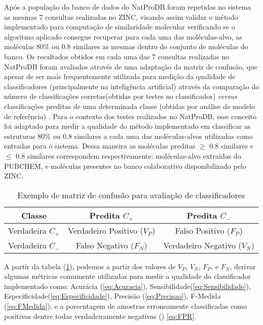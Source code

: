 Após a população do banco de dados do NatProDB foram repetidas no sistema as mesmas 7 consultas realizadas no ZINC, visando assim validar o método implementado para computação de similaridade molecular verificando se o algoritmo aplicado consegue recuperar para cada uma das moléculas-alvo, as moléculas 80\% ou 0.8 similares as mesmas dentro do conjunto de moléculas do banco. Os resultados obtidos em cada uma das 7 consultas realizadas no NatProDB foram avaliados através de uma adaptação da matriz de confusão, que apesar de ser mais frequentemente utilizada para medição da qualidade de classificadores (principalmente na inteligência artificial) através da comparação do número de classificações corretas(obtidas por testes no classificador) \textit{versus} classificações preditas de uma determinada classe (obtidas por análise de modelo de referência) \cite{davis2006relationship}. Para o contexto dos testes realizados no NatProDB, esse conceito foi adaptado para medir a qualidade do método implementado em classificar as estruturas 80\% ou 0.8 similares a cada uma das moléculas-alvos utilizadas como entradas para o sistema. Dessa maneira as moléculas preditas $\geq$ 0.8 similares e $\leq$ 0.8 similares correspondem respectivamente: moléculas-alvo extraídas do PUBCHEM, e moléculas presentes no banco colaborativo disponibilizado pelo ZINC.

\begin{table}[!htb]
	\centering
	\footnotesize
	\caption[Matriz de Confusão]{Exemplo de matriz de confusão para avaliação de classificadores}
	\label{tab:matrizconfusao}	
	\begin{tabular}{|c|c|c|}
		\hline \SPACE
		\textbf{Classe}&\textbf{Predita $C_+$} & \textbf{Predita $C_-$} \\ \hline \SPACE
	Verdadeira $C_+$  &	Verdadeiro Positivo ($V_P$) & Falso Positivo ($F_P$) \\ \hline \SPACE
	Verdadeira $C_-$  & Falso Negativo ($F_N$) & Verdadeiro Negativo ($V_N$)\\ \hline 
	\end{tabular}
\end{table}  

A partir da tabela (\ref{tab:matrizconfusao}), podemos  a partir dos valores de $V_P$, $V_N$, $F_P$, e $F_N$, derivar algumas métricas comumente utilizadas para medir a qualidade do classificador implementado como: Acurácia (\ref{eq:Acuracia}), Sensibilidade(\ref{eq:Sensibilidade}), Especificidade(\ref{eq:Especificidade}), Precisão (\ref{eq:Precisao}), F-Medida (\ref{eq:FMedida}), e a porcentagem de amostras erroneamente classificadas como positivas dentre todas verdadeiramente negativas () \eqref{eq:FPR}. 

